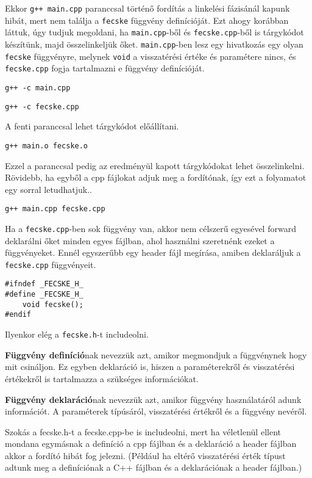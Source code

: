 \documentclass[a4paper,11.5pt,table]{article}
\begin{document}
	Ekkor \texttt{g++ main.cpp} paranccsal történő fordítás a linkelési fázisánál kapunk hibát, mert nem találja a \texttt{fecske} függvény definícióját. Ezt ahogy korábban láttuk, úgy tudjuk megoldani, ha \texttt{main.cpp}-ből és \texttt{fecske.cpp}-ből is tárgykódot készítünk, majd összelinkeljük őket. \texttt{main.cpp}-ben lesz egy hivatkozás egy olyan \texttt{fecske} függvényre, melynek \texttt{void} a visszatérési értéke és paramétere nincs, és \texttt{fecske.cpp} fogja tartalmazni e függvény definícióját. 
		
    {\centering\texttt{g++ -c main.cpp}\par}

	{\centering\texttt{g++ -c fecske.cpp}\par}

	A fenti paranccsal lehet tárgykódot előállítani.
	
	{\centering\texttt{g++ main.o fecske.o}\par}
	
	Ezzel a paranccsal pedig az eredményül kapott tárgykódokat lehet összelinkelni. Rövidebb, ha egyből a cpp fájlokat adjuk meg a fordítónak, így ezt a folyamatot egy sorral letudhatjuk..

	{\centering\texttt{g++ main.cpp fecske.cpp} \par}
	
	Ha a \texttt{fecske.cpp}-ben sok függvény van, akkor nem célszerű egyesével forward deklarálni őket minden egyes fájlban, ahol használni szeretnénk ezeket a függvényeket. Ennél egyszerűbb egy header fájl megírása, amiben deklaráljuk a \texttt{fecske.cpp} függvényeit.
	\bigskip
	
	\begin{lstlisting}
#ifndef _FECSKE_H_
#define _FECSKE_H_
	void fecske();
#endif
	\end{lstlisting}
	Ilyenkor elég a \texttt{fecske.h}-t includeolni.
	\medskip
	
	\textbf{Függvény definíció}nak nevezzük azt, amikor megmondjuk a függvénynek hogy mit csináljon. Ez egyben deklaráció is, hiszen a paraméterekről és visszatérési értékekről is tartalmazza a szükséges információkat.
	\medskip
	
	\textbf{Függvény deklaráció}nak nevezzük azt, amikor függvény használatáról adunk információt. A paraméterek típúsáról, visszatérési értékről és a függvény nevéről.
	\medskip
	
  Szokás a fecske.h-t a fecske.cpp-be is includeolni, mert ha véletlenül ellent mondana egymásnak a definíció a cpp fájlban és a deklaráció a header fájlban akkor a fordító hibát fog jelezni. (Például ha eltérő visszatérési érték típust adtunk meg a definíciónak a C++ fájlban és a deklarációnak a header fájlban.)
	
\end{document}
